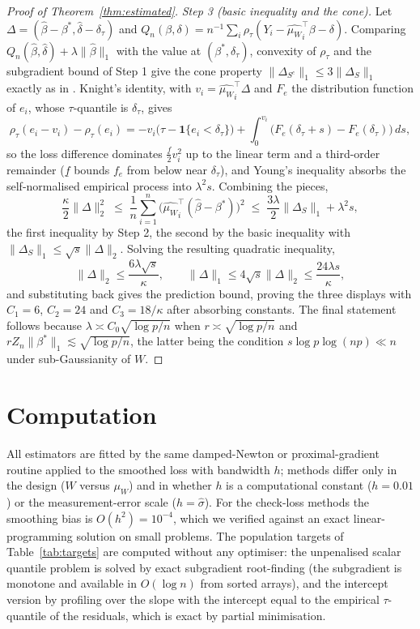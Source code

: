 \documentclass[12pt,a4paper]{article}
\theoremstyle{definition}
\theoremstyle{remark}
\newcommand{\ind}[1]{\mathbf{1}\{#1\}}
\newcommand{\betas}{\beta^*}
\newcommand{\sigmah}{\hat{\sigma}}
\newcommand{\muv}{\mu_W}
\begin{document}
\begin{proof}[Proof of Theorem~\ref{thm:estimated}]
\emph{Step 3 (basic inequality and the cone).} Let
$\Delta=(\hat\beta-\betas,\hat\delta-\delta_\tau)$ and
$Q_n(\beta,\delta)=n^{-1}\sum_i\rho_\tau(Y_i-{\hat{\muv}}_i^\top\beta-\delta)$. Comparing
$Q_n(\hat\beta,\hat\delta)+\lambda\|\hat\beta\|_1$ with the value at $(\betas,\delta_\tau)$,
convexity of $\rho_\tau$ and the subgradient bound of Step 1 give the
cone property $\|\Delta_{S^c}\|_1\le3\|\Delta_S\|_1$ exactly as in
\citet[Lemma 3]{belloni2011l1}. Knight's identity, with
$v_i={\hat{\muv}}_i^\top\Delta$ and $F_e$ the distribution function of $e_i$, whose
$\tau$-quantile is $\delta_\tau$, gives
\begin{equation*}
\rho_\tau(e_i-v_i)-\rho_\tau(e_i)
= -v_i\big(\tau-\ind{e_i<\delta_\tau}\big)+\int_0^{v_i}\big(F_e(\delta_\tau+s)-F_e(\delta_\tau)\big)\,ds ,
\end{equation*}
so the loss difference dominates $\frac{\underline f}{2}v_i^2$ up to the linear term and a
third-order remainder ($\underline f$ bounds $f_e$ from below near $\delta_\tau$), and
Young's inequality absorbs the self-normalised empirical process into
$\lambda^2s$. Combining the pieces,
\begin{equation*}
\frac{\kappa}{2}\|\Delta\|_2^2 \;\le\; \frac1n\sum_{i=1}^n
\big({\hat{\muv}}_i^\top(\hat\beta-\betas)\big)^2
\;\le\; \frac{3\lambda}{2}\|\Delta_S\|_1+\lambda^2s ,
\end{equation*}
the first inequality by Step 2, the second by the basic inequality with
$\|\Delta_S\|_1\le\sqrt s\|\Delta\|_2$. Solving the resulting quadratic inequality,
\[
\|\Delta\|_2\le\frac{6\lambda\sqrt s}{\kappa},
\qquad
\|\Delta\|_1\le4\sqrt s\|\Delta\|_2\le\frac{24\lambda s}{\kappa},
\]
and substituting back gives the prediction bound, proving the three displays with
$C_1=6$, $C_2=24$ and $C_3=18/\kappa$ after absorbing constants. The final statement
follows because $\lambda\asymp C_0\sqrt{\log p/n}$ when $r\asymp\sqrt{\log p/n}$ and
$rZ_n\|\betas\|_1\lesssim\sqrt{\log p/n}$, the latter being the condition
$s\log p\log(np)\ll n$ under sub-Gaussianity of $W$.
\end{proof}

\section{Computation}
\label{app:computation}

All estimators are fitted by the same damped-Newton or proximal-gradient routine applied to
the smoothed loss with bandwidth $h$; methods differ only in the design ($W$ versus
$\muv$) and in whether $h$ is a computational constant ($h=0.01$) or the measurement-error
scale ($h=\sigmah$). For the check-loss methods the smoothing bias is
$O(h^2)=10^{-4}$, which we verified against an exact linear-programming solution on small
problems. The population targets of Table~\ref{tab:targets} are computed without any
optimiser: the unpenalised scalar quantile problem is solved by exact subgradient
root-finding (the subgradient is monotone and available in $O(\log n)$ from sorted arrays),
and the intercept version by profiling over the slope with the intercept equal to the
empirical $\tau$-quantile of the residuals, which is exact by partial minimisation.
\end{document}
